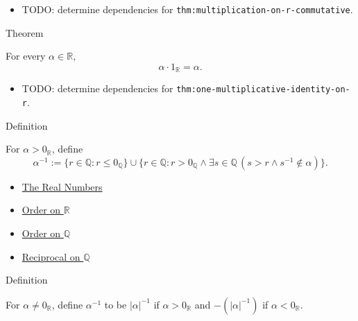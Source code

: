\begin{dependencies}
\begin{itemize}
  \item TODO: determine dependencies for \texttt{thm:multiplication-on-r-commutative}.
\end{itemize}
\end{dependencies}

\begin{theorembox}{Theorem}
\begin{theorem}
\label{thm:one-multiplicative-identity-on-r}
For every $\alpha\in\mathbb{R}$,
\[
\alpha\cdot 1_{\mathbb{R}}=\alpha.
\]
\end{theorem}
\end{theorembox}

\begin{dependencies}
\begin{itemize}
  \item TODO: determine dependencies for \texttt{thm:one-multiplicative-identity-on-r}.
\end{itemize}
\end{dependencies}

\begin{definitionbox}{Definition}
\begin{definition}
\label{def:reciprocal-positive-on-r}
For $\alpha>0_{\mathbb{R}}$, define
\[
\alpha^{-1}:=\{r\in\mathbb{Q}:r\le 0_{\mathbb{Q}}\}
\cup
\{r\in\mathbb{Q}:r>0_{\mathbb{Q}}\land \exists s\in\mathbb{Q}\,(s>r\land s^{-1}\notin\alpha)\}.
\]
\end{definition}
\end{definitionbox}

\begin{dependencies}
\begin{itemize}
  \item \hyperref[def:reals]{The Real Numbers}
  \item \hyperref[def:order-on-r]{Order on $\mathbb{R}$}
  \item \hyperref[def:order-on-q]{Order on $\mathbb{Q}$}
  \item \hyperref[def:reciprocal-on-q-classes]{Reciprocal on $\mathbb{Q}$}
\end{itemize}
\end{dependencies}

\begin{definitionbox}{Definition}
\begin{definition}
\label{def:reciprocal-on-r}
For $\alpha\ne0_{\mathbb{R}}$, define $\alpha^{-1}$ to be $|\alpha|^{-1}$ if
$\alpha>0_{\mathbb{R}}$ and $-(|\alpha|^{-1})$ if $\alpha<0_{\mathbb{R}}$.
\end{definition}
\end{definitionbox}

